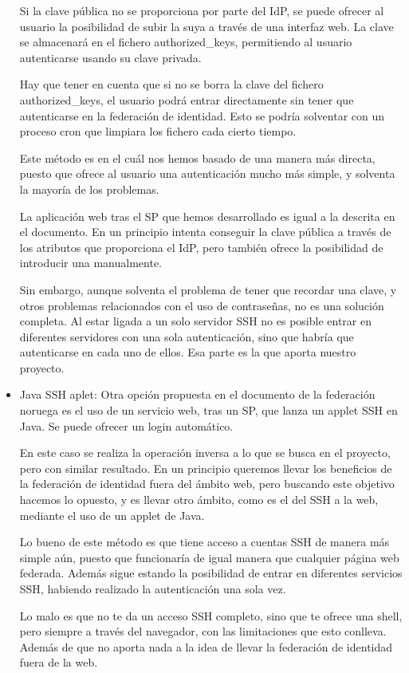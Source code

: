 \begin{itemize}
        Si la clave pública no se proporciona por parte del IdP, se
        puede ofrecer al usuario la posibilidad de subir la suya a
        través de una interfaz web. La clave se almacenará en el
        fichero authorized\_keys, permitiendo al usuario autenticarse
        usando su clave privada.

        Hay que tener en cuenta que si no se borra la clave del
        fichero authorized\_keys, el usuario podrá entrar directamente
        sin tener que autenticarse en la federación de identidad. Esto
        se podría solventar con un proceso cron que limpiara los
        fichero cada cierto tiempo.

        Este método es en el cuál nos hemos basado de una manera más
        directa, puesto que ofrece al usuario una autenticación mucho
        más simple, y solventa la mayoría de los problemas.

        La aplicación web tras el SP que hemos desarrollado es igual a
        la descrita en el documento. En un principio intenta conseguir
        la clave pública a través de los atributos que proporciona el
        IdP, pero también ofrece la posibilidad de introducir una
        manualmente.

        Sin embargo, aunque solventa el problema de tener que recordar
        una clave, y otros problemas relacionados con el uso de
        contraseñas, no es una solución completa. Al estar ligada a un
        solo servidor SSH no es posible entrar en diferentes
        servidores con una sola autenticación, sino que habría que
        autenticarse en cada uno de ellos. Esa parte es la que aporta
        nuestro proyecto.

        \item{Java SSH aplet:}
        Otra opción propuesta en el documento de la federación noruega
        es el uso de un servicio web, tras un SP, que lanza un applet
        SSH en Java. Se puede ofrecer un login automático.

        En este caso se realiza la operación inversa a lo que se busca
        en el proyecto, pero con similar resultado. En un principio
        queremos llevar los beneficios de la federación de identidad
        fuera del ámbito web, pero buscando este objetivo hacemos lo
        opuesto, y es llevar otro ámbito, como es el del SSH a la web,
        mediante el uso de un applet de Java.

        Lo bueno de este método es que tiene acceso a cuentas SSH de
        manera más simple aún, puesto que funcionaría de igual manera
        que cualquier página web federada. Además sigue estando la
        posibilidad de entrar en diferentes servicios SSH, habiendo
        realizado la autenticación una sola vez.

        Lo malo es que no te da un acceso SSH completo, sino que te
        ofrece una shell, pero siempre a través del navegador, con las
        limitaciones que esto conlleva. Además de que no aporta nada a
        la idea de llevar la federación de identidad fuera de la web.

    \end{itemize}

